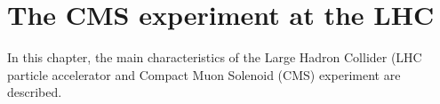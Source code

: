 \chapter{The CMS experiment at the LHC}\label{chap2}
\thispagestyle{empty}
In this chapter, the main characteristics of the Large Hadron Collider (LHC particle accelerator and Compact Muon Solenoid (CMS) experiment are described.





